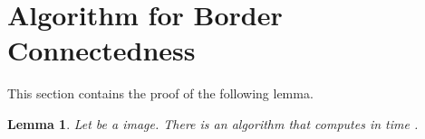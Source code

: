 \documentclass[11pt,english]{article}
\newtheorem{lemma}[theorem]{Lemma}
\numberwithin{figure}{section}
\begin{document}
\begin{comment}
\paragraph{Analysis of Algorithm~\ref{alg:connectedness_tester-na}.}
If the input image  is connected, the algorithm always accepts because there are no witnesses.

Consider an image  that is -far from connected, i.e., . Then by Lemma~\ref{lm:repair_witnesses}, .
For fixed   the probability that Algorithm~\ref{alg:connectedness_tester-na} fails to detect a witness of level   is
. Thus, the overall probability that it fails to detect a witness is at most


Assume that the algorithm detects a witness . There are at most  pixels  in . Since , there are at least  black pixels in , and at least   of them are outside .  The probability that Algorithm~\ref{alg:connectedness_tester-na} fails to detect at least one of these black pixels in Step~\ref{step:conn-tester-pixel-sampling} is at most . Thus, the algorithm detects a witness and a black pixel outside it with probability at least  as required.




\paragraph{Query and time complexity.}
The algorithm samples  squares of , for
, and inside each square queries
 pixels.
Thus, the query complexity of the algorithm is

The time complexity is linear in the number of samples, since BFS takes time linear in the number of vertices on bounded-degree graphs, and the remaining steps can be easily implemented to run in the time proportional to the number of sampled pixels.
\end{proof}
\end{comment}

\iffalse
\appendix

\section{Algorithm for Border Connectedness}
\label{sec:border-con}
\newcommand{\Out}{\mbox{\it Out}}
\newcommand{\cMb}{\overline{{\mathcal M}}}
\newcommand{\Be}{{\bf B}}

This section contains the proof of the following lemma.

\begin{lemma}
\label{thm:border-con}
Let  be a  image. There is an algorithm that computes  in time .
\end{lemma}
\end{document}
